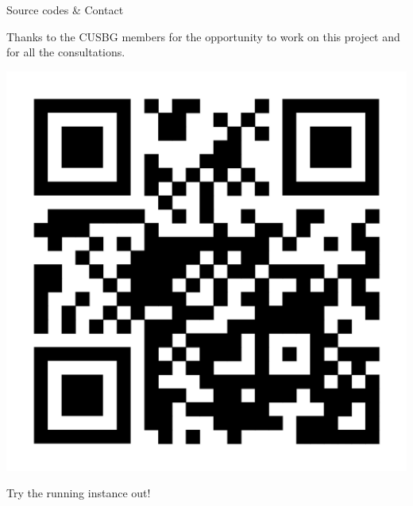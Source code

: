 \documentclass[portrait,a0paper,fontscale=0.25]{baposter}
\begin{document}
\begin{poster}
\begin{posterbox}[column=1, name=conclusion, below=result2, bottomaligned=tech]{Source codes \& Contact}
\begin{minipage}[t]{\linewidth}
\begin{minipage}[t]{0.75\linewidth}
		Thanks to the CUSBG members for the opportunity to work on this project and for all the consultations.
	\end{minipage}
	\quad
	\begin{minipage}[t]{0.20\linewidth}
		\vspace{-2ex}
		\includegraphics[width=1\linewidth]{./img/qr_prankweb_cz.png} %
		\begin{center}
			Try the running instance out!
		\end{center}
	\end{minipage}
\end{minipage}


\end{posterbox}

\end{poster}
\end{document}
